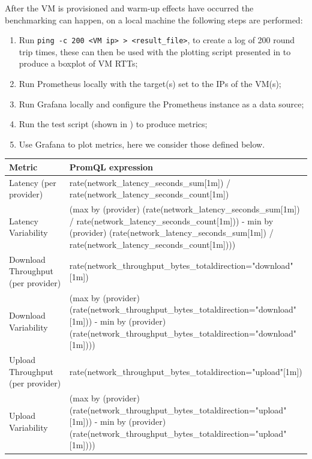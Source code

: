\documentclass[11pt,a4paper]{article}
\begin{document}
After the VM is provisioned and warm-up effects have occurred the benchmarking can happen, on a local machine the following steps are performed:
\begin{enumerate}
  \item{Run \texttt{ping -c 200 <VM ip> > <result\_file>}, to create a log of 200 round trip times, these can then be used with the plotting script presented in  to produce a boxplot of VM RTTs;}
    \item{Run Prometheus locally with the target(s) set to the IPs of the VM(s);}
    \item{Run Grafana locally and configure the Prometheus instance as a data source;}
  \item{Run the test script (shown in ) to produce metrics;}
  \item{Use Grafana to plot metrics, here we consider those defined below.}
\end{enumerate}

\begin{center}
  \begin{tabular}{P{0.2\linewidth} | P{0.8\linewidth}}
    Metric & PromQL expression \\
    \hline

Latency (per provider) & rate(network\_latency\_seconds\_sum[1m]) / rate(network\_latency\_seconds\_count[1m]) \\
Latency Variability & (max by (provider) (rate(network\_latency\_seconds\_sum[1m]) / rate(network\_latency\_seconds\_count[1m])) - min by (provider) (rate(network\_latency\_seconds\_sum[1m]) / rate(network\_latency\_seconds\_count[1m]))) \\

    \hline
Download Throughput (per provider) & rate(network\_throughput\_bytes\_total{direction="download"}[1m]) \\
Download Variability & (max by (provider) (rate(network\_throughput\_bytes\_total{direction="download"}[1m])) - min by (provider) (rate(network\_throughput\_bytes\_total{direction="download"}[1m]))) \\

    \hline
Upload Throughput (per provider) & rate(network\_throughput\_bytes\_total{direction="upload"}[1m]) \\
Upload Variability & (max by (provider) (rate(network\_throughput\_bytes\_total{direction="upload"}[1m])) - min by (provider) (rate(network\_throughput\_bytes\_total{direction="upload"}[1m]))) \\

  \end{tabular}
\end{center}
\end{document}
